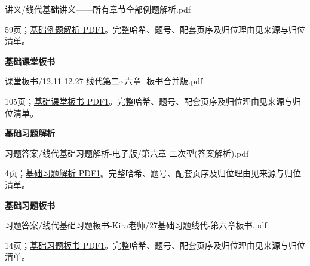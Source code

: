 \documentclass[UTF8,fontset=fandol,11pt,a4paper]{ctexart}
\newcommand{\source}[1]{{\footnotesize\color{Muted}#1\par}}
\begin{document}
讲义/线代基础讲义——所有章节全部例题解析.pdf\par
\source{59页；\href{file:///Users/skyintelligence/Desktop/\%E5\%BE\%97\%E8\%AF\%BB\%E4\%B8\%AA\%E7\%A0\%94-\%E5\%8C\%97\%E5\%A4\%A7\%E8\%BD\%AF\%E5\%BE\%AE/\%E6\%95\%B0\%E5\%AD\%A6\%20150/\%E8\%AE\%B2\%E4\%B9\%89/\%E7\%BA\%BF\%E4\%BB\%A3\%E5\%9F\%BA\%E7\%A1\%80\%E8\%AE\%B2\%E4\%B9\%89\%E2\%80\%94\%E2\%80\%94\%E6\%89\%80\%E6\%9C\%89\%E7\%AB\%A0\%E8\%8A\%82\%E5\%85\%A8\%E9\%83\%A8\%E4\%BE\%8B\%E9\%A2\%98\%E8\%A7\%A3\%E6\%9E\%90.pdf\#page=1}{基础例题解析 PDF1}。完整哈希、题号、配套页序及归位理由见来源与归位清单。}
\textbf{基础课堂板书}\par
课堂板书/12.11-12.27 线代第二\textasciitilde{}六章 -板书合并版.pdf\par
\source{105页；\href{file:///Users/skyintelligence/Desktop/\%E5\%BE\%97\%E8\%AF\%BB\%E4\%B8\%AA\%E7\%A0\%94-\%E5\%8C\%97\%E5\%A4\%A7\%E8\%BD\%AF\%E5\%BE\%AE/\%E6\%95\%B0\%E5\%AD\%A6\%20150/\%E8\%AF\%BE\%E5\%A0\%82\%E6\%9D\%BF\%E4\%B9\%A6/12.11-12.27\%20\%E7\%BA\%BF\%E4\%BB\%A3\%E7\%AC\%AC\%E4\%BA\%8C~\%E5\%85\%AD\%E7\%AB\%A0\%20-\%E6\%9D\%BF\%E4\%B9\%A6\%E5\%90\%88\%E5\%B9\%B6\%E7\%89\%88.pdf\#page=1}{基础课堂板书 PDF1}。完整哈希、题号、配套页序及归位理由见来源与归位清单。}
\textbf{基础习题解析}\par
习题答案/线代基础习题解析-电子版/第六章 二次型(答案解析).pdf\par
\source{4页；\href{file:///Users/skyintelligence/Desktop/\%E5\%BE\%97\%E8\%AF\%BB\%E4\%B8\%AA\%E7\%A0\%94-\%E5\%8C\%97\%E5\%A4\%A7\%E8\%BD\%AF\%E5\%BE\%AE/\%E6\%95\%B0\%E5\%AD\%A6\%20150/\%E4\%B9\%A0\%E9\%A2\%98\%E7\%AD\%94\%E6\%A1\%88/\%E7\%BA\%BF\%E4\%BB\%A3\%E5\%9F\%BA\%E7\%A1\%80\%E4\%B9\%A0\%E9\%A2\%98\%E8\%A7\%A3\%E6\%9E\%90-\%E7\%94\%B5\%E5\%AD\%90\%E7\%89\%88/\%E7\%AC\%AC\%E5\%85\%AD\%E7\%AB\%A0\%20\%E4\%BA\%8C\%E6\%AC\%A1\%E5\%9E\%8B\%28\%E7\%AD\%94\%E6\%A1\%88\%E8\%A7\%A3\%E6\%9E\%90\%29.pdf\#page=1}{基础习题解析 PDF1}。完整哈希、题号、配套页序及归位理由见来源与归位清单。}
\textbf{基础习题板书}\par
习题答案/线代基础习题板书-Kira老师/27基础习题线代-第六章板书.pdf\par
\source{14页；\href{file:///Users/skyintelligence/Desktop/\%E5\%BE\%97\%E8\%AF\%BB\%E4\%B8\%AA\%E7\%A0\%94-\%E5\%8C\%97\%E5\%A4\%A7\%E8\%BD\%AF\%E5\%BE\%AE/\%E6\%95\%B0\%E5\%AD\%A6\%20150/\%E4\%B9\%A0\%E9\%A2\%98\%E7\%AD\%94\%E6\%A1\%88/\%E7\%BA\%BF\%E4\%BB\%A3\%E5\%9F\%BA\%E7\%A1\%80\%E4\%B9\%A0\%E9\%A2\%98\%E6\%9D\%BF\%E4\%B9\%A6-Kira\%E8\%80\%81\%E5\%B8\%88/27\%E5\%9F\%BA\%E7\%A1\%80\%E4\%B9\%A0\%E9\%A2\%98\%E7\%BA\%BF\%E4\%BB\%A3-\%E7\%AC\%AC\%E5\%85\%AD\%E7\%AB\%A0\%E6\%9D\%BF\%E4\%B9\%A6.pdf\#page=1}{基础习题板书 PDF1}。完整哈希、题号、配套页序及归位理由见来源与归位清单。}
\end{document}
